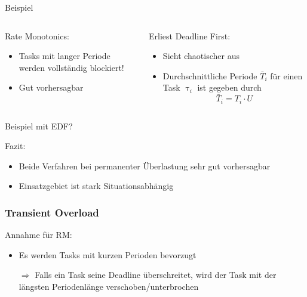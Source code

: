 \begin{frame}{Beispiel}
	
	
\end{frame}

\begin{frame}{\subsubsecname}
	\begin{columns}[]
  			\begin{column}{0.5\textwidth}
				Rate Monotonics:
				\begin{itemize}
					\item Tasks mit langer Periode werden vollständig blockiert!
					\item Gut vorhersagbar
				\end{itemize}

			\end{column}
  			\begin{column}{0.5\textwidth}
  				Erliest Deadline First:
				\begin{itemize}
					\item Sieht chaotischer aus
					\item Durchschnittliche Periode $\bar{T}_i$ für einen Task $\uptau_i$ ist gegeben durch
						\begin{equation}
							\bar{T}_i=T_i\cdot U
						\end{equation}
				\end{itemize}	
  			\end{column}
	\end{columns}
\end{frame}

\begin{frame}{\subsubsecname}
	Beispiel mit EDF? %
\end{frame}

\begin{frame}{\subsubsecname}
	Fazit:
	\begin{itemize}
		\item Beide Verfahren bei permanenter Überlastung sehr gut vorhersagbar
		\item Einsatzgebiet ist stark Situationsabhängig
	\end{itemize}
\end{frame}

\subsubsection{Transient Overload}
\begin{frame}{\subsubsecname}
	Annahme für RM:
	\begin{itemize}
		\item Es werden Tasks mit kurzen Perioden bevorzugt\pause
		\item[$\Rightarrow$] Falls ein Task seine Deadline überschreitet, wird der Task mit der längsten Periodenlänge verschoben/unterbrochen	
	\end{itemize}
\end{frame}

